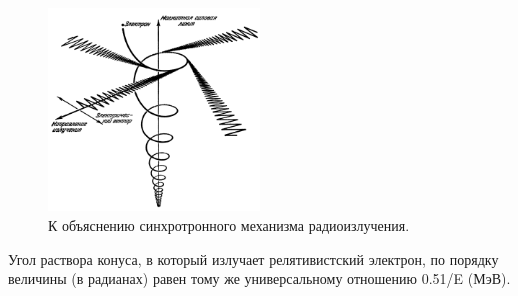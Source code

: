 \documentclass[a4paper,12pt]{extarticle}
\begin{document}
\begin{figure}[!htb]
	\centering
	\includegraphics[width=0.5\textwidth]{synchrotron_radiation.png}
	\caption{
		К объяснению синхротронного механизма радиоизлучения.
	}
	\label{fig:synchrotron_radiation}
\end{figure}
Угол раствора конуса, в который излучает релятивистский электрон, по порядку величины (в радианах) равен тому же универсальному отношению 0.51/E (МэВ).

\clearpage
\sloppy
\printbibliography

\end{document}
